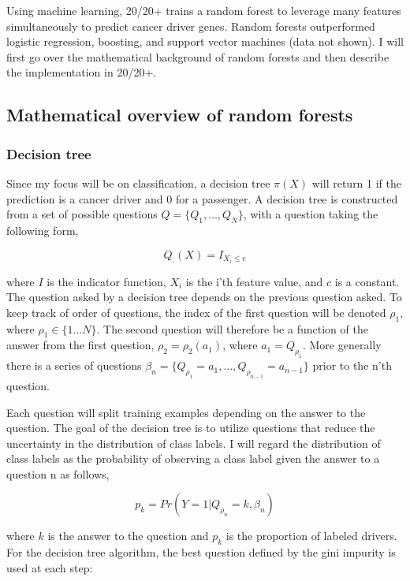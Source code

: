 Using machine learning, 20/20+ trains a random forest to leverage many features simultaneously to predict cancer driver genes. Random forests outperformed logistic regression, boosting, and support vector machines (data not shown). I will first go over the mathematical background of random forests and then describe the implementation in 20/20+.

\subsection{Mathematical overview of random forests}

\subsubsection{Decision tree}

Since my focus will be on classification, a decision tree $\pi(X)$ will return 1 if the prediction is a cancer driver and 0 for a passenger. A decision tree is constructed from a set of possible questions $Q=\{Q_1,…,Q_N\}$, with a question taking the following form,

\begin{equation}
Q_.(X)=I_{X_i \leq c}
\end{equation}

where $I$ is the indicator function, $X_i$ is the i'th feature value, and $c$ is a constant. The question asked by a decision tree depends on the previous question asked. To keep track of order of questions, the index of the first question will be denoted $\rho_1$, where $\rho_1∈\{1…N\}$. The second question will therefore be a function of the answer from the first question, $\rho_2=\rho_2(a_1)$, where $a_1=Q_{\rho_1}$. More generally there is a series of questions $\beta_n=\{Q_{\rho_1}=a_1,…,Q_{\rho_{n-1}}=a_{n-1}\}$ prior to the n'th question.

Each question will split training examples depending on the answer to the question. The goal of the decision tree is to utilize questions that reduce the uncertainty in the distribution of class labels. I will regard the distribution of class labels as the probability of observing a class label given the answer to a question n as follows,

\begin{equation}
p_k=Pr⁡(Y=1|Q_{ρ_n}=k,\beta_n)
\end{equation}

where $k$ is the answer to the question and $p_k$ is the proportion of labeled drivers. For the decision tree algorithm, the best question defined by the gini impurity is used at each step:

